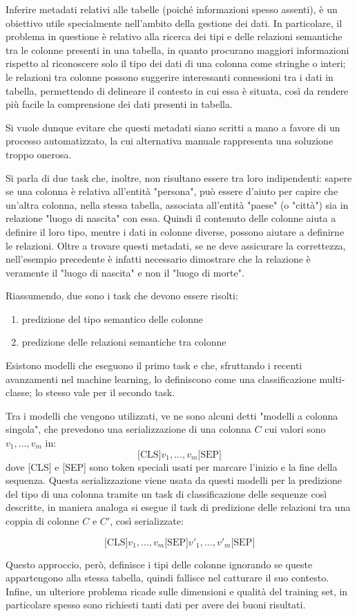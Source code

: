 Inferire metadati relativi alle tabelle (poiché informazioni spesso assenti), è un obiettivo utile specialmente nell'ambito della gestione dei dati. In particolare, il problema in questione è relativo alla ricerca dei tipi e delle relazioni semantiche tra le colonne presenti in una tabella, in quanto procurano maggiori informazioni rispetto al riconoscere solo il tipo dei dati di una colonna come stringhe o interi; le relazioni tra colonne possono suggerire interessanti connessioni tra i dati in tabella, permettendo di delineare il contesto in cui essa è situata, così da rendere più facile la comprensione dei dati presenti in tabella. 

Si vuole dunque evitare che questi metadati siano scritti a mano a favore di un processo automatizzato, la cui alternativa manuale rappresenta una soluzione troppo onerosa.

Si parla di due task che, inoltre, non risultano essere tra loro indipendenti: sapere se una colonna è relativa all'entità "persona", può essere d'aiuto per capire che un'altra colonna, nella stessa tabella, associata all'entità "paese" (o "città") sia in relazione "luogo di nascita" con essa. Quindi il contenuto delle colonne aiuta a definire il loro tipo, mentre i dati in colonne diverse, possono aiutare a definirne le relazioni. Oltre a trovare questi metadati, se ne deve assicurare la correttezza, nell'esempio precedente è infatti necessario dimostrare che la relazione è veramente il "luogo di nascita" e non il "luogo di morte".

Riassumendo, due sono i task che devono essere risolti: 
\begin{enumerate}
    \item predizione del tipo semantico delle colonne
    \item predizione delle relazioni semantiche tra colonne
\end{enumerate}

Esistono modelli che eseguono il primo task e che, sfruttando i recenti avanzamenti nel machine learning, lo definiscono come una classificazione multi-classe; lo stesso vale per il secondo task.

Tra i modelli che vengono utilizzati, ve ne sono alcuni detti "modelli a colonna singola", che prevedono una serializzazione di una colonna $C$ cui valori sono $v_{1},...,v_{m}$ in: 
\[\text{[CLS]} v_{1},...,v_{m} \text{[SEP]}\]
dove [CLS] e [SEP] sono token speciali usati per marcare l'inizio e la fine della sequenza. Questa serializzazione viene usata da questi modelli per la predizione del tipo di una colonna tramite un task di classificazione delle sequenze così descritte, in maniera analoga si esegue il task di predizione delle relazioni tra una coppia di colonne $C$ e $C'$, così serializzate:

\[\text{[CLS]}v_{1},...,v_{m} \text{[SEP]} v'_{1},...,v'_{m} \text{[SEP]}\]

Questo approccio, però, definisce i tipi delle colonne ignorando se queste appartengono alla stessa tabella, quindi fallisce nel catturare il suo contesto.
Infine, un ulteriore problema ricade sulle dimensioni e qualità del training set, in particolare spesso sono richiesti tanti dati per avere dei buoni risultati.